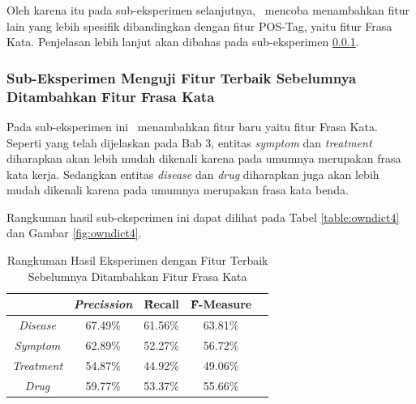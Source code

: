 	Oleh karena itu pada sub-eksperimen selanjutnya, \saya~mencoba menambahkan fitur lain yang lebih spesifik dibandingkan dengan fitur POS-Tag, yaitu fitur Frasa Kata. Penjelasan lebih lanjut akan dibahas pada sub-eksperimen \ref{eks:subeksfrasa}.
	
	\subsubsection{Sub-Eksperimen Menguji Fitur Terbaik Sebelumnya Ditambahkan Fitur Frasa Kata}\label{eks:subeksfrasa}
	Pada sub-eksperimen ini \saya~menambahkan fitur baru yaitu fitur Frasa Kata. Seperti yang telah dijelaskan pada Bab 3, entitas \textit{symptom} dan \textit{treatment} diharapkan akan lebih mudah dikenali karena pada umumnya merupakan frasa kata kerja. Sedangkan entitas \textit{disease} dan \textit{drug} diharapkan juga akan lebih mudah dikenali karena pada umumnya merupakan frasa kata benda.
	
	Rangkuman hasil sub-eksperimen ini dapat dilihat pada Tabel \ref{table:owndict4} dan Gambar \ref{fig:owndict4}.
	
	\begin{table}
		\centering
		\caption{Rangkuman Hasil Eksperimen dengan Fitur Terbaik Sebelumnya Ditambahkan Fitur Frasa Kata}
		\begin{tabular}{|c|c|c|c|c|}
			\hline
			                      & \textit{Precission} & \f{\f{Recall}} & \f{\f{F-Measure}} \\ \hline
			\textit{Disease}      & 67.49\%             & 61.56\%        & 63.81\%           \\ \hline
			\textit{Symptom}      & 62.89\%             & 52.27\%        & 56.72\%           \\ \hline
			\textit{Treatment}    & 54.87\%             & 44.92\%        & 49.06\%           \\ \hline
			\textit{Drug}		  & 59.77\%             & 53.37\%        & 55.66\%           \\ \hline
		\end{tabular}
		\label{table:owndict5}
	\end{table}


